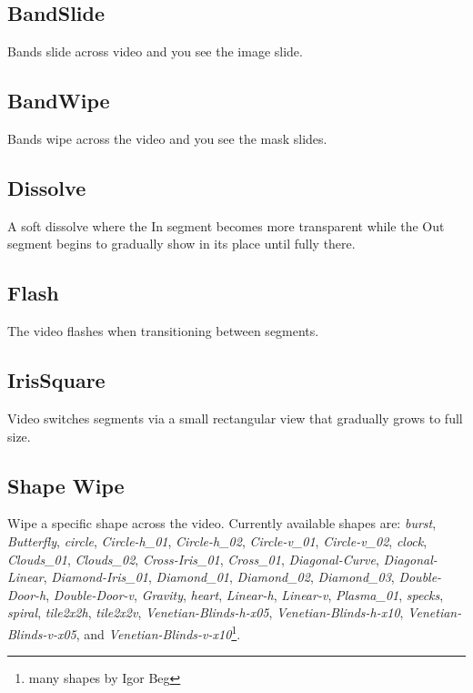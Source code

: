 \subsection*{BandSlide}%
\label{sub:bandslide}

Bands slide across video and you see the image slide.

\subsection*{BandWipe}%
\label{sub:bandwipe}

Bands wipe across the video and you see the mask slides.

\subsection*{Dissolve}%
\label{sub:dissolve}

A soft dissolve where the In segment becomes more transparent while the Out segment begins to gradually show in its place until fully there.

\subsection*{Flash}%
\label{sub:flash}

The video flashes when transitioning between segments.

\subsection*{IrisSquare}%
\label{sub:irissquare}

Video switches segments via a small rectangular view that gradually grows to full size.

\subsection*{Shape Wipe}%
\label{sub:shape_wipe}

Wipe a specific shape across the video. Currently available shapes are: \textit{burst}, \textit{Butterfly},
 \textit{circle}, \textit{Circle-h\_01}, \textit{Circle-h\_02}, \textit{Circle-v\_01}, \textit{Circle-v\_02},
 \textit{clock}, \textit{Clouds\_01}, \textit{Clouds\_02}, \textit{Cross-Iris\_01}, \textit{Cross\_01},
\textit{Diagonal-Curve}, \textit{Diagonal-Linear}, \textit{Diamond-Iris\_01}, \textit{Diamond\_01},
 \textit{Diamond\_02}, \textit{Diamond\_03}, \textit{Double-Door-h}, \textit{Double-Door-v}, \textit{Gravity},
\textit{heart}, \textit{Linear-h}, \textit{Linear-v}, \textit{Plasma\_01}, 
 \textit{specks}, \textit{spiral}, \textit{tile2x2h}, \textit{tile2x2v}, \textit{Venetian-Blinds-h-x05},
 \textit{Venetian-Blinds-h-x10}, \textit{Venetian-Blinds-v-x05}, and \textit{Venetian-Blinds-v-x10}\protect\footnote{many shapes by Igor Beg}. 

